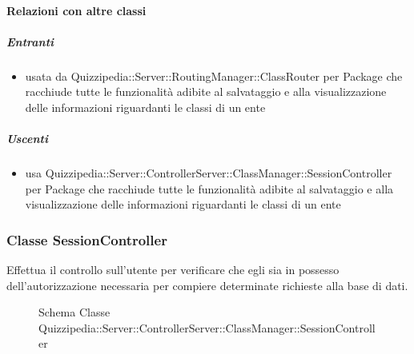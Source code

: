 \paragraph{Relazioni con altre classi}
\subparagraph{Entranti}
\begin{itemize}
\item usata da Quizzipedia::Server::RoutingManager::ClassRouter per Package che racchiude tutte le funzionalità adibite al salvataggio e alla visualizzazione delle informazioni riguardanti le classi di un ente
\end{itemize}
\subparagraph{Uscenti}
\begin{itemize}
\item usa Quizzipedia::Server::ControllerServer::ClassManager::SessionController per Package che racchiude tutte le funzionalità adibite al salvataggio e alla visualizzazione delle informazioni riguardanti le classi di un ente
\end{itemize}
\subsubsection{Classe SessionController}
Effettua il controllo sull'utente per verificare che egli sia in possesso dell'autorizzazione necessaria per compiere determinate richieste alla base di dati.
\begin{figure}[H]
\centering
\noindent{}
\caption[Schema Classe SessionController]{Schema Classe Quizzipedia::Server::ControllerServer::ClassManager::SessionController}
\end{figure}
